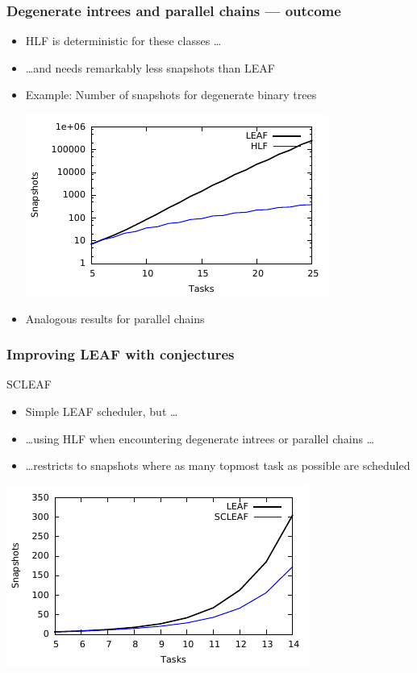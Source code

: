 \documentclass{beamer}
\begin{document}
\begin{frame}
  \frametitle{Degenerate intrees and parallel chains --- outcome}
  \begin{itemize}
  \item HLF is deterministic for these classes \dots
  \item \dots and needs remarkably less snapshots than LEAF
  \item Example: Number of snapshots for degenerate binary trees
    \begin{center}
      \includegraphics{deg_intrees.pdf}
    \end{center}
  \item Analogous results for parallel chains
  \end{itemize}
\end{frame}

\begin{frame}
  \frametitle{Improving LEAF with conjectures}
  \begin{block}{SCLEAF}
    \begin{itemize}
    \item Simple LEAF scheduler, but \dots
    \item \dots using HLF when encountering degenerate intrees or parallel chains \dots
    \item \dots restricts to snapshots where as many topmost task as possible are scheduled
    \end{itemize}
  \end{block}
  \begin{center}
    \includegraphics{scleaf.pdf}
  \end{center}
\end{frame}
\end{document}
